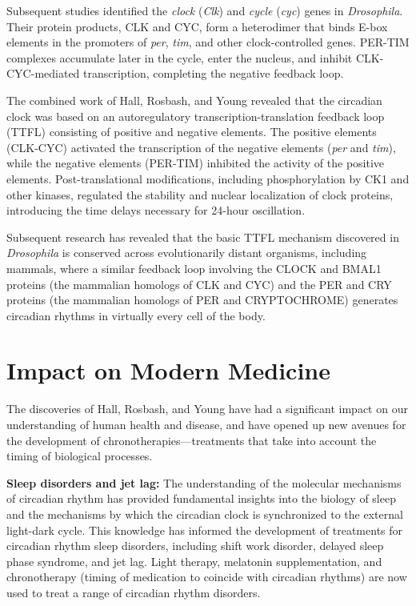 Subsequent studies identified the \textit{clock} (\textit{Clk}) and \textit{cycle} (\textit{cyc}) genes in \textit{Drosophila}. Their protein products, CLK and CYC, form a heterodimer that binds E-box elements in the promoters of \textit{per}, \textit{tim}, and other clock-controlled genes. PER-TIM complexes accumulate later in the cycle, enter the nucleus, and inhibit CLK-CYC-mediated transcription, completing the negative feedback loop.

The combined work of Hall, Rosbash, and Young revealed that the circadian clock was based on an autoregulatory transcription-translation feedback loop (TTFL) consisting of positive and negative elements. The positive elements (CLK-CYC) activated the transcription of the negative elements (\textit{per} and \textit{tim}), while the negative elements (PER-TIM) inhibited the activity of the positive elements. Post-translational modifications, including phosphorylation by CK1 and other kinases, regulated the stability and nuclear localization of clock proteins, introducing the time delays necessary for 24-hour oscillation.

Subsequent research has revealed that the basic TTFL mechanism discovered in \textit{Drosophila} is conserved across evolutionarily distant organisms, including mammals, where a similar feedback loop involving the CLOCK and BMAL1 proteins (the mammalian homologs of CLK and CYC) and the PER and CRY proteins (the mammalian homologs of PER and CRYPTOCHROME) generates circadian rhythms in virtually every cell of the body.

\section{Impact on Modern Medicine}

The discoveries of Hall, Rosbash, and Young have had a significant impact on our understanding of human health and disease, and have opened up new avenues for the development of chronotherapies---treatments that take into account the timing of biological processes.

\textbf{Sleep disorders and jet lag:} The understanding of the molecular mechanisms of circadian rhythm has provided fundamental insights into the biology of sleep and the mechanisms by which the circadian clock is synchronized to the external light-dark cycle. This knowledge has informed the development of treatments for circadian rhythm sleep disorders, including shift work disorder, delayed sleep phase syndrome, and jet lag. Light therapy, melatonin supplementation, and chronotherapy (timing of medication to coincide with circadian rhythms) are now used to treat a range of circadian rhythm disorders.


